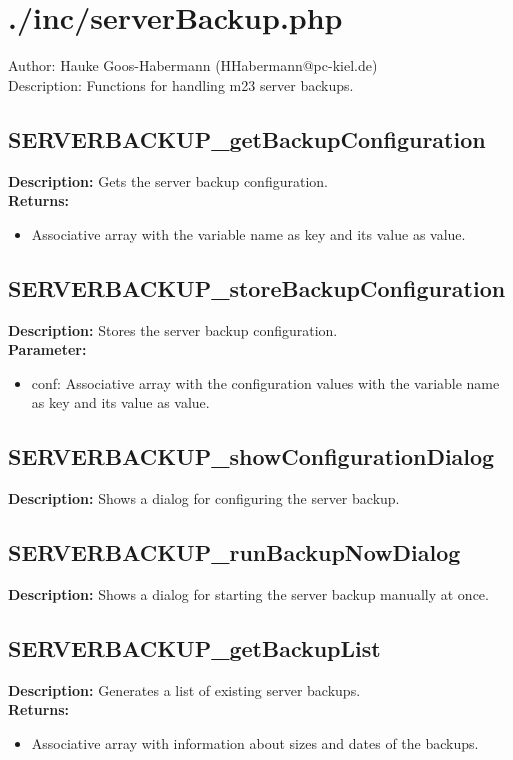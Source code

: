 \newpage\section{./inc/serverBackup.php}
 Author: Hauke Goos-Habermann (HHabermann@pc-kiel.de)\\
 Description: Functions for handling m23 server backups.\\

\subsection{SERVERBACKUP\_getBackupConfiguration}
\textbf{Description:} Gets the server backup configuration.\\
\textbf{Returns:}
\begin{itemize}
\item Associative array with the variable name as key and its value as value.
\end{itemize}

\subsection{SERVERBACKUP\_storeBackupConfiguration}
\textbf{Description:} Stores the server backup configuration.\\
\textbf{Parameter:}
\begin{itemize}
\item conf: Associative array with the configuration values with the variable name as key and its value as value.
\end{itemize}

\subsection{SERVERBACKUP\_showConfigurationDialog}
\textbf{Description:} Shows a dialog for configuring the server backup.\\

\subsection{SERVERBACKUP\_runBackupNowDialog}
\textbf{Description:} Shows a dialog for starting the server backup manually at once.\\

\subsection{SERVERBACKUP\_getBackupList}
\textbf{Description:} Generates a list of existing server backups.\\
\textbf{Returns:}
\begin{itemize}
\item Associative array with information about sizes and dates of the backups.
\end{itemize}

